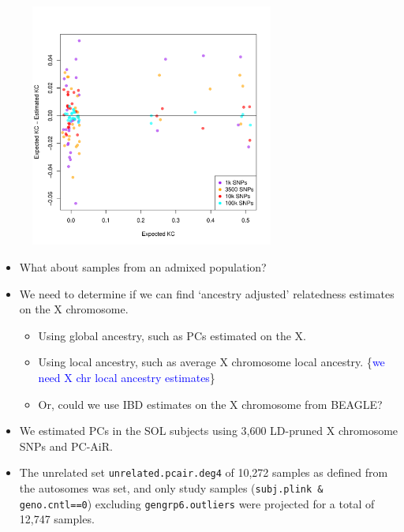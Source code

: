 \documentclass{beamer}
\begin{document}
\begin{frame}
\centering
\begin{figure}
\includegraphics[height=8cm]{../xchr_kc_estimatedVsTrue_MM.pdf}
\end{figure}
\end{frame}

\begin{frame}
\begin{itemize}
\item What about samples from an admixed population?
\item We need to determine if we can find `ancestry adjusted' relatedness estimates on the X chromosome.
\begin{itemize}
	\item Using global ancestry, such as PCs estimated on the X. 
	\item Using local ancestry, such as average X chromosome local ancestry. \{\textcolor{blue}{we need X chr local ancestry estimates}\}
\item Or, could we use IBD estimates on the X chromosome from BEAGLE?
\end{itemize}
\end{itemize}
\end{frame}


\begin{frame}
\begin{itemize}
\item We estimated PCs in the SOL subjects using 3,600 LD-pruned X chromosome SNPs and PC-AiR.
\item The unrelated set \texttt{unrelated.pcair.deg4} of 10,272 samples as defined from the autosomes was set, and only study samples (\texttt{subj.plink \& geno.cntl==0}) excluding \texttt{gengrp6.outliers} were projected for a total of 12,747 samples.
\end{itemize}
\end{frame}
\end{document}
